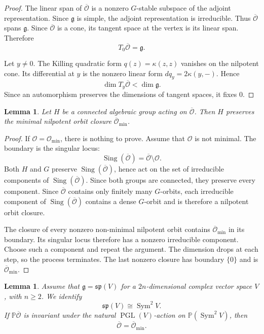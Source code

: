 \documentclass[12pt]{article}
\newtheorem{lemma}[theorem]{Lemma}
\theoremstyle{remark}
\theoremstyle{plain}
\DeclareMathOperator{\Sing}{Sing}
\DeclareMathOperator{\Sym}{Sym}
\begin{document}
\begin{proof}
The linear span of $\overline{\mathcal O}$ is a nonzero
$G$-stable subspace of the adjoint representation.
Since $\mathfrak g$ is simple, the adjoint representation is
irreducible. Thus $\overline{\mathcal O}$ spans $\mathfrak g$.
Since $\overline{\mathcal O}$ is a cone, its tangent space at the
vertex is its linear span. Therefore
\[
T_0\overline{\mathcal O}=\mathfrak g.
\]

Let $y\ne0$.
The Killing quadratic form $q(z)=\kappa(z,z)$ vanishes on the
nilpotent cone. Its differential at $y$ is the nonzero linear form
$dq_y=2\kappa(y,-)$.
Hence
\[
\dim T_y\overline{\mathcal O}<\dim\mathfrak g.
\]
Since an automorphism preserves the dimensions of tangent spaces, it
fixes $0$.
\end{proof}

\begin{lemma}\label{lem:minimal-preserved}
Let $H$ be a connected algebraic group acting on
$\overline{\mathcal O}$.
Then $H$ preserves the minimal nilpotent orbit closure
$\overline{\mathcal O}_{\min}$.
\end{lemma}

\begin{proof}
If $\mathcal O=\mathcal O_{\min}$, there is nothing to prove. Assume
that $\mathcal O$ is not minimal. The boundary is the singular locus:
\[
\Sing(\overline{\mathcal O})
=\overline{\mathcal O}\setminus\mathcal O.
\]
Both $H$ and $G$ preserve
$\Sing(\overline{\mathcal O})$, hence act on the set of irreducible
components of $\Sing(\overline{\mathcal O})$.
Since both groups are connected, they preserve every component.
Since $\overline{\mathcal O}$ contains only finitely many $G$-orbits,
each irreducible component of $\Sing(\overline{\mathcal O})$ contains
a dense $G$-orbit and is therefore a nilpotent orbit closure.

The closure of every nonzero non-minimal nilpotent orbit contains
$\overline{\mathcal O}_{\min}$ in its boundary.
Its singular locus therefore has a nonzero irreducible component.
Choose such a component and repeat the argument.
The dimension drops at each step, so the process terminates.
The last nonzero closure has boundary $\{0\}$ and is
$\overline{\mathcal O}_{\min}$.
\end{proof}

\begin{lemma}\label{lem:sp-pgl}
Assume that $\mathfrak g=\mathfrak{sp}(V)$ for a $2n$-dimensional
complex vector space $V$, with $n\geq2$.
We identify
\[
\mathfrak{sp}(V)\cong\Sym^2V.
\]
If $\mathbb P\overline{\mathcal O}$ is invariant under the natural
$\operatorname{PGL}(V)$-action on $\mathbb P(\Sym^2V)$, then
\[
\overline{\mathcal O}=\overline{\mathcal O}_{\min}.
\]
\end{lemma}
\end{document}
